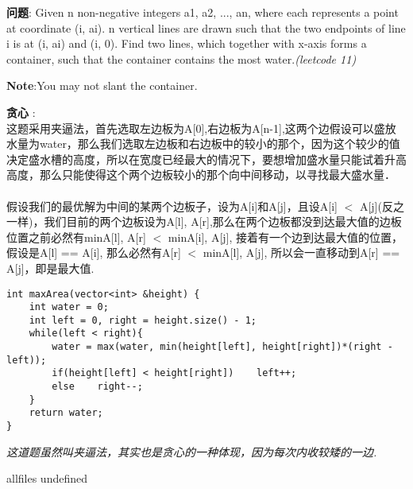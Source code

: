 \documentclass{article}
\begin{document}
\begin{CJK}{UTF8}{gbsn}     %

\else
    
\begin{description}
    \item{\textbf{问题}}: Given n non-negative integers a1, a2, ..., an, where each represents a point at coordinate (i, ai). n vertical lines are drawn such that the two endpoints of line i is at (i, ai) and (i, 0). Find two lines, which together with x-axis forms a container, such that the container contains the most water.\textit{(leetcode 11)}

    \item{\textbf{Note}}:You may not slant the container. 
    \item{\textbf{贪心}} : 
    \\这题采用夹逼法，首先选取左边板为A[0],右边板为A[n-1],这两个边假设可以盛放水量为water，那么我们选取左边板和右边板中的较小的那个，因为这个较少的值决定盛水槽的高度，所以在宽度已经最大的情况下，要想增加盛水量只能试着升高高度，那么只能使得这个两个边板较小的那个向中间移动，以寻找最大盛水量．\\
	\\假设我们的最优解为中间的某两个边板子，设为A[i]和A[j]，且设A[i] $<$ A[j](反之一样)，我们目前的两个边板设为A[l], A[r],那么在两个边板都没到达最大值的边板位置之前必然有min{A[l], A[r]} $<$ min{A[i], A[j]}, 接着有一个边到达最大值的位置，假设是A[l] == A[i], 那么必然有A[r] $<$ min{A[l], A[j]}, 所以会一直移动到A[r] == A[j]，即是最大值.
    \begin{lstlisting}
int maxArea(vector<int> &height) {
	int water = 0;
	int left = 0, right = height.size() - 1;
	while(left < right){
		water = max(water, min(height[left], height[right])*(right - left));
		if(height[left] < height[right])	left++;
		else	right--;
	}
	return water;
}
    \end{lstlisting}
    \textit{这道题虽然叫夹逼法，其实也是贪心的一种体现，因为每次内收较矮的一边.}
\end{description}

\fi

\ifx allfiles undefined
\end{CJK}
\end{document}
